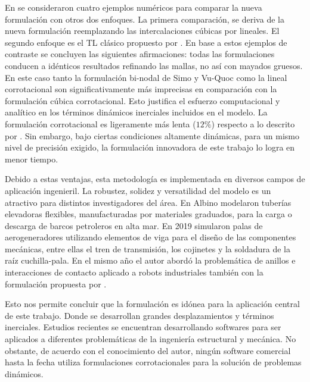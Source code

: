 En \cite{Le2014} se consideraron cuatro ejemplos numéricos para comparar la nueva formulación con otros dos enfoques. La primera comparación, se deriva de la nueva formulación reemplazando las intercalaciones cúbicas por lineales. El segundo enfoque es el TL clásico propuesto por \cite{simo1988dynamics}. En base a estos ejemplos de contraste se concluyen las siguientes afirmaciones: todas las formulaciones conducen a idénticos resultados refinando las mallas, no así con mayados gruesos. En este caso tanto la formulación bi-nodal de Simo y Vu-Quoc como la lineal corrotacional son significativamente más imprecisas en comparación con la formulación cúbica corrotacional. Esto justifica el esfuerzo computacional y analítico en los términos dinámicos inerciales incluidos en el modelo. La formulación corrotacional es ligeramente más lenta ($12\%$) respecto a lo descrito por \cite{simo1988dynamics}. Sin embargo, bajo ciertas condiciones altamente dinámicas, para un mismo nivel de precisión exigido, la formulación innovadora de este trabajo lo logra en menor tiempo.  

Debido a estas ventajas, esta metodología es implementada en diversos campos de aplicación ingenieril. La robustez, solidez y versatilidad del modelo es un atractivo para distintos investigadores del área. En \cite{albino2018co} Albino modelaron tuberías elevadoras flexibles, manufacturadas por materiales graduados, para la carga o descarga de barcos petroleros en alta mar. En 2019 \cite{asadi2019multibody} simularon palas de aerogeneradores utilizando elementos de viga para el diseño de las componentes mecánicas, entre ellas el tren de transmisión, los cojinetes y la soldadura de la raíz cuchilla-pala. En el mismo año el autor \cite{barzanooni2018modeling} abordó la problemática de anillos e interacciones de contacto aplicado a robots industriales también con la formulación propuesta por \cite{Le2014}.

Esto nos permite concluir que la formulación es idónea para la aplicación central de este trabajo. Donde se desarrollan grandes desplazamientos y términos inerciales. Estudios recientes se encuentran desarrollando softwares para ser aplicados a diferentes problemáticas de la ingeniería estructural y mecánica. No obstante, de acuerdo con el conocimiento del autor, ningún software comercial hasta la fecha utiliza formulaciones corrotacionales para la solución de problemas dinámicos.

 

